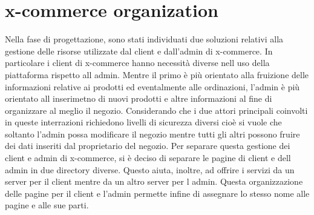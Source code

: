 \section{x-commerce organization}
\label{sec:x_commerce_organization}
Nella fase di progettazione, sono stati individuati due soluzioni relativi alla gestione delle risorse utilizzate dal client e dall’admin di x-commerce. In particolare i client di x-commerce hanno necessità diverse nell uso della piattaforma rispetto all admin. Mentre il primo è più orientato alla fruizione delle informazioni relative ai prodotti ed eventalmente alle ordinazioni, l’admin è più orientato all inserimetno di nuovi prodotti e altre informazioni al fine di organizzare al meglio il negozio. Considerando che i due attori principali coinvolti in queste interrazioni richiedono livelli di sicurezza diversi cioè si vuole che soltanto l’admin possa modificare il negozio mentre tutti gli altri possono fruire dei dati inseriti dal proprietario del negozio.
\newline
Per separare questa gestione dei client e admin di x-commerce, si è deciso di separare le pagine di client e dell admin in due directory diverse. Questo aiuta, inoltre, ad offrire i servizi da un server per il client mentre da un altro server per l admin.
\newline
Questa organizzazione delle pagine per il client e l’admin permette infine di assegnare lo stesso nome alle pagine e alle sue parti.
